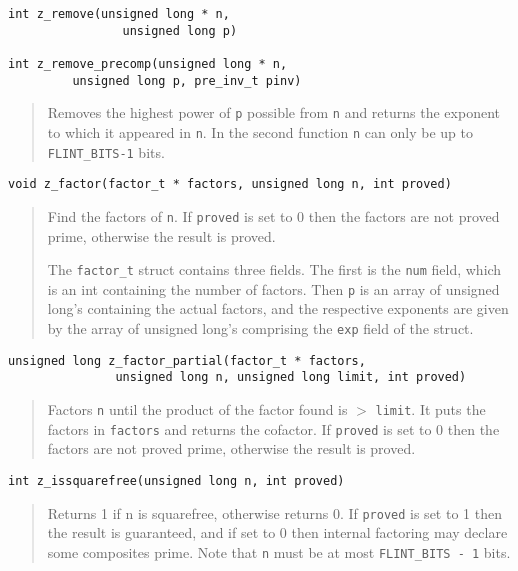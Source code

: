 \documentclass[a4paper,10pt]{article}
\newcommand{\code}{\lstinline}
\begin{document}
\begin{lstlisting}
int z_remove(unsigned long * n, 
                unsigned long p)

int z_remove_precomp(unsigned long * n, 
         unsigned long p, pre_inv_t pinv)
\end{lstlisting}
\begin{quote}
Removes the highest power of \code{p} possible from \code{n} and returns the exponent to which it appeared in \code{n}.  In the second function \code{n} can only be up to \code{FLINT_BITS-1} bits.
\end{quote}

\begin{lstlisting}
void z_factor(factor_t * factors, unsigned long n, int proved)
\end{lstlisting}
\begin{quote}
Find the factors of \code{n}.  If \code{proved} is set to 0 then the factors are not proved prime, otherwise the result is proved.

The \code{factor_t} struct contains three fields. The first is the \code{num} field, which is an int containing the number of factors. Then \code{p} is an array of unsigned long's containing the actual factors, and the respective exponents are given by the array of unsigned long's comprising the \code{exp} field of the struct.
\end{quote}

\begin{lstlisting}
unsigned long z_factor_partial(factor_t * factors,
               unsigned long n, unsigned long limit, int proved)
\end{lstlisting}
\begin{quote}
Factors \code{n} until the product of the factor found is $>$ \code{limit}. It puts the factors in \code{factors} and returns the cofactor.  If \code{proved} is set to 0 then the factors are not proved prime, otherwise the result is proved.
\end{quote}

\begin{lstlisting}
int z_issquarefree(unsigned long n, int proved)
\end{lstlisting}
\begin{quote}
Returns 1 if n is squarefree, otherwise returns 0. If \code{proved} is set to 1 then the result is guaranteed, and if set to 0 then internal factoring may declare some composites prime. Note that \code{n} must be at most \code{FLINT_BITS - 1} bits.
\end{quote}
\end{document}
